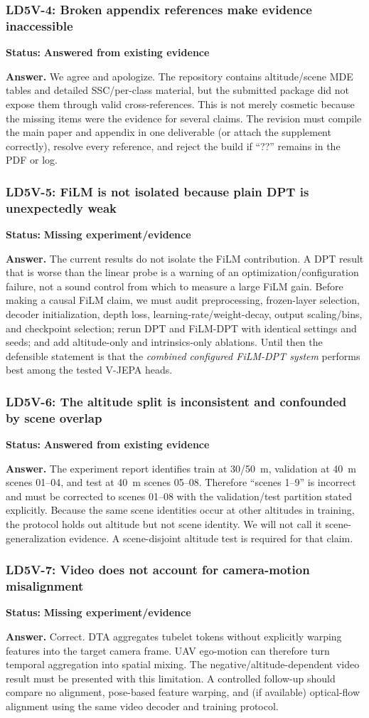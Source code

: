 \documentclass[10pt]{article}
\newcommand{\answered}{\textcolor{answered}{\textbf{Answered from existing evidence}}}
\newcommand{\missing}{\textcolor{missing}{\textbf{Missing experiment/evidence}}}
\newenvironment{reviewpoint}[2]
  {\subsubsection{#1}\noindent\textbf{Status:} #2\par\smallskip}
  {}
\begin{document}
\begin{reviewpoint}{LD5V-4: Broken appendix references make evidence inaccessible}{\answered}
\textbf{Answer.} We agree and apologize. The repository contains altitude/scene MDE
tables and detailed SSC/per-class material, but the submitted package did not expose them
through valid cross-references. This is not merely cosmetic because the missing items were
the evidence for several claims. The revision must compile the main paper and appendix in
one deliverable (or attach the supplement correctly), resolve every reference, and reject
the build if ``??'' remains in the PDF or log.
\end{reviewpoint}

\begin{reviewpoint}{LD5V-5: FiLM is not isolated because plain DPT is unexpectedly weak}{\missing}
\textbf{Answer.} The current results do not isolate the FiLM contribution. A DPT result
that is worse than the linear probe is a warning of an optimization/configuration failure,
not a sound control from which to measure a large FiLM gain. Before making a causal FiLM
claim, we must audit preprocessing, frozen-layer selection, decoder initialization, depth
loss, learning-rate/weight-decay, output scaling/bins, and checkpoint selection; rerun DPT
and FiLM-DPT with identical settings and seeds; and add altitude-only and intrinsics-only
ablations. Until then the defensible statement is that the \emph{combined configured
FiLM-DPT system} performs best among the tested V-JEPA heads.
\end{reviewpoint}

\begin{reviewpoint}{LD5V-6: The altitude split is inconsistent and confounded by scene overlap}{\answered}
\textbf{Answer.} The experiment report identifies train at 30/50~m, validation at 40~m
scenes 01--04, and test at 40~m scenes 05--08. Therefore ``scenes 1--9'' is incorrect and
must be corrected to scenes 01--08 with the validation/test partition stated explicitly.
Because the same scene identities occur at other altitudes in training, the protocol holds
out altitude but not scene identity. We will not call it scene-generalization evidence. A
scene-disjoint altitude test is required for that claim.
\end{reviewpoint}

\begin{reviewpoint}{LD5V-7: Video does not account for camera-motion misalignment}{\missing}
\textbf{Answer.} Correct. DTA aggregates tubelet tokens without explicitly warping
features into the target camera frame. UAV ego-motion can therefore turn temporal
aggregation into spatial mixing. The negative/altitude-dependent video result must be
presented with this limitation. A controlled follow-up should compare no alignment,
pose-based feature warping, and (if available) optical-flow alignment using the same video
decoder and training protocol.
\end{reviewpoint}
\end{document}

